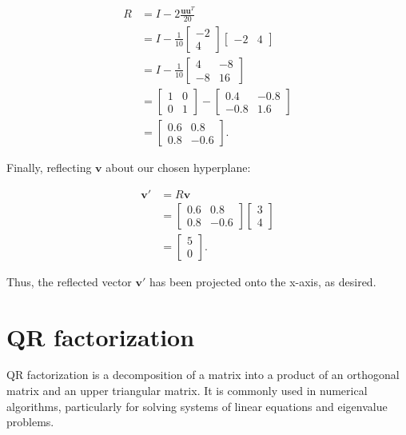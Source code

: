 \begin{align*}
R &= I - 2\frac{\mathbf{u}\mathbf{u}^T}{20} \\
&= I - \frac{1}{10}\begin{bmatrix} -2 \\ 4 \end{bmatrix}\begin{bmatrix} -2 & 4 \end{bmatrix} \\
&= I - \frac{1}{10}\begin{bmatrix} 4 & -8 \\ -8 & 16 \end{bmatrix} \\
&= \begin{bmatrix} 1 & 0 \\ 0 & 1 \end{bmatrix} - \begin{bmatrix} 0.4 & -0.8 \\ -0.8 & 1.6 \end{bmatrix} \\
&= \begin{bmatrix} 0.6 & 0.8 \\ 0.8 & -0.6 \end{bmatrix}.
\end{align*}

Finally, reflecting \( \mathbf{v} \) about our chosen hyperplane:

\begin{align*}
\mathbf{v}' &= R\mathbf{v} \\
&= \begin{bmatrix} 0.6 & 0.8 \\ 0.8 & -0.6 \end{bmatrix}\begin{bmatrix} 3 \\ 4 \end{bmatrix} \\
&= \begin{bmatrix} 5 \\ 0 \end{bmatrix}.
\end{align*}

Thus, the reflected vector \( \mathbf{v}' \) has been projected onto the x-axis, as desired.

\chapter{QR factorization}
QR factorization is a decomposition of a matrix into a product of an orthogonal matrix and an upper triangular matrix.
It is commonly used in numerical algorithms, particularly for solving systems of linear equations and eigenvalue problems.

